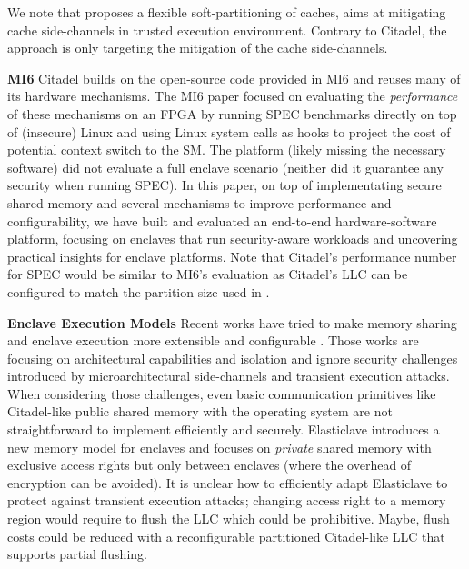 We note \cite{enclavecaches} that proposes a flexible soft-partitioning of caches, aims at mitigating cache side-channels in trusted execution environment. Contrary to Citadel, the approach is only targeting the mitigation of the cache side-channels.

\noindent\textbf{MI6}
Citadel builds on the open-source code provided in MI6 \cite{bourgeat2019mi6} and reuses many of its hardware mechanisms.
The MI6 paper focused on evaluating the \emph{performance} of these mechanisms on an FPGA
by running SPEC benchmarks directly on top of (insecure) Linux and using Linux system calls as hooks to project the cost of potential context switch to the SM.
The platform (likely missing the necessary software) did not evaluate a full enclave scenario (neither did it guarantee any security when running SPEC).
In this paper, on top of implementating secure shared-memory and several mechanisms to improve performance and configurability, we have built and evaluated an end-to-end hardware-software platform, focusing on enclaves that run security-aware workloads and uncovering practical insights for enclave platforms.
Note that Citadel's performance number for SPEC would be similar to MI6's evaluation as Citadel's LLC can be configured to match the partition size used in \cite{bourgeat2019mi6}.

\noindent\textbf{Enclave Execution Models}
Recent works have tried to make memory sharing and enclave execution more extensible and configurable \cite{van2023cheri, li2021confidential, lee2022cerberus, park2020nested, steinegger2021servas}.
Those works are focusing on architectural capabilities and isolation and ignore security challenges introduced by microarchitectural side-channels and transient execution attacks.
When considering those challenges, even basic communication primitives like Citadel-like public shared memory with the operating system are not straightforward to implement efficiently and securely.
Elasticlave\cite{yu2022elasticlave} introduces a new memory model for enclaves and focuses on \emph{private} shared memory with exclusive access rights but only between enclaves (where the overhead of encryption can be avoided).
It is unclear how to efficiently adapt Elasticlave to protect against transient execution attacks; changing access right to a memory region would require to flush the LLC which could be prohibitive. Maybe, flush costs could be reduced with a reconfigurable partitioned Citadel-like LLC that supports partial flushing.

